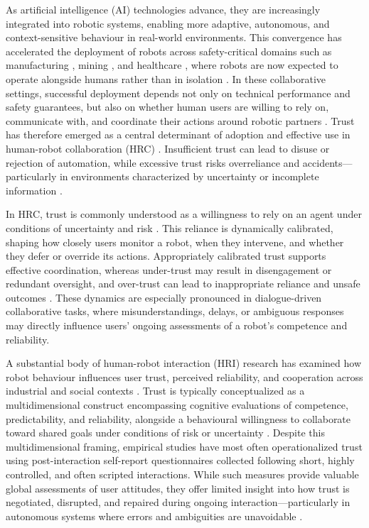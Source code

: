 \documentclass[
]{article}
\begin{document}
As artificial intelligence (AI) technologies advance, they are
increasingly integrated into robotic systems, enabling more adaptive,
autonomous, and context-sensitive behaviour in real-world environments.
This convergence has accelerated the deployment of robots across
safety-critical domains such as manufacturing \autocite{choi2025},
mining \autocite{fu2021}, and healthcare \autocite{ciuffreda2025}, where
robots are now expected to operate alongside humans rather than in
isolation \autocite{diab2025,spitale2023}. In these collaborative
settings, successful deployment depends not only on technical
performance and safety guarantees, but also on whether human users are
willing to rely on, communicate with, and coordinate their actions
around robotic partners \autocite{campagna2025,emaminejad2022}. Trust
has therefore emerged as a central determinant of adoption and effective
use in human-robot collaboration (HRC)
\autocite{wischnewski2023,campagna2025}. Insufficient trust can lead to
disuse or rejection of automation, while excessive trust risks
overreliance and accidents---particularly in environments characterized
by uncertainty or incomplete information \autocite{devisser2020}.

In HRC, trust is commonly understood as a willingness to rely on an
agent under conditions of uncertainty and risk
\autocite{muir1994,hancock2011}. This reliance is dynamically
calibrated, shaping how closely users monitor a robot, when they
intervene, and whether they defer or override its actions. Appropriately
calibrated trust supports effective coordination, whereas under-trust
may result in disengagement or redundant oversight, and over-trust can
lead to inappropriate reliance and unsafe outcomes
\autocite{devisser2020}. These dynamics are especially pronounced in
dialogue-driven collaborative tasks, where misunderstandings, delays, or
ambiguous responses may directly influence users' ongoing assessments of
a robot's competence and reliability.

A substantial body of human-robot interaction (HRI) research has
examined how robot behaviour influences user trust, perceived
reliability, and cooperation across industrial and social contexts
\autocite{shayganfar2019,fartook2025}. Trust is typically conceptualized
as a multidimensional construct encompassing cognitive evaluations of
competence, predictability, and reliability, alongside a behavioural
willingness to collaborate toward shared goals under conditions of risk
or uncertainty \autocite{muir1994,hancock2011,devisser2020}. Despite
this multidimensional framing, empirical studies have most often
operationalized trust using post-interaction self-report questionnaires
collected following short, highly controlled, and often scripted
interactions. While such measures provide valuable global assessments of
user attitudes, they offer limited insight into how trust is negotiated,
disrupted, and repaired during ongoing interaction---particularly in
autonomous systems where errors and ambiguities are unavoidable
\autocite{maure}.
\end{document}
